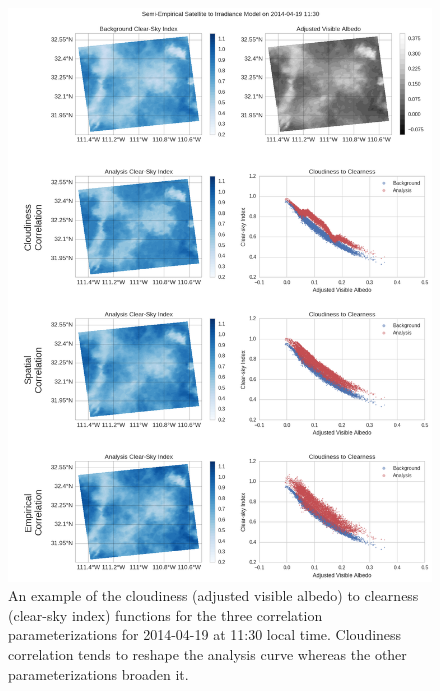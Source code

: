 \begin{figure}[p]
\centering
\includegraphics[width=.9\textwidth]{figs/cld_to_clear_Semi-Empirical_2014-04-19.png}
\caption[Clearness versus Cloudiness for SE model on 4/19]{An example
  of the cloudiness (adjusted visible albedo) to clearness (clear-sky
  index) functions for the three correlation parameterizations for
  2014-04-19 at 11:30 local time. Cloudiness correlation tends to
  reshape the analysis curve whereas the other parameterizations broaden it.}
\label{fig:cldclr_se_419}
\end{figure}

